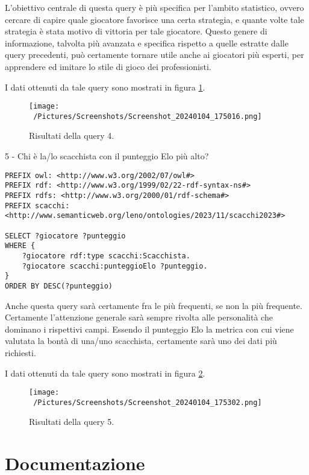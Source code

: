 \documentclass[12pt]{book}
\begin{document}
L'obiettivo centrale di questa query è più specifica per l'ambito
statistico, ovvero cercare di capire quale giocatore favorisce una
certa strategia, e quante volte tale strategia è stata motivo di
vittoria per tale giocatore. Questo genere di informazione, talvolta
più avanzata e specifica rispetto a quelle estratte dalle query
precedenti, può certamente tornare utile anche ai giocatori più
esperti, per apprendere ed imitare lo stile di gioco dei
professionisti.

I dati ottenuti da tale query sono mostrati in figura \ref{fig:query4}.

\begin{figure}[h]
  \caption{Risultati della query 4.}
  \centering
  \label{fig:query4}
  \texttt{[image: ~/Pictures/Screenshots/Screenshot\_20240104\_175016.png]}
\end{figure} 

5 - Chi è la/lo scacchista con il punteggio Elo più alto?

\begin{verbatim}
PREFIX owl: <http://www.w3.org/2002/07/owl#>
PREFIX rdf: <http://www.w3.org/1999/02/22-rdf-syntax-ns#>
PREFIX rdfs: <http://www.w3.org/2000/01/rdf-schema#>
PREFIX scacchi: <http://www.semanticweb.org/leno/ontologies/2023/11/scacchi2023#>

SELECT ?giocatore ?punteggio
WHERE {
    ?giocatore rdf:type scacchi:Scacchista.
    ?giocatore scacchi:punteggioElo ?punteggio.
}
ORDER BY DESC(?punteggio)
\end{verbatim}

Anche questa query sarà certamente fra le più frequenti, se non la più
frequente. Certamente l'attenzione generale sarà sempre rivolta alle
personalità che dominano i rispettivi campi. Essendo il punteggio Elo
la metrica con cui viene valutata la bontà di una/uno scacchista,
certamente sarà uno dei dati più richiesti.

I dati ottenuti da tale query sono mostrati in figura \ref{fig:query5}.

\begin{figure}[h]
  \caption{Risultati della query 5.}
  \centering
  \label{fig:query5}
  \texttt{[image: ~/Pictures/Screenshots/Screenshot\_20240104\_175302.png]}
\end{figure} 

\chapter{Documentazione}
\end{document}
